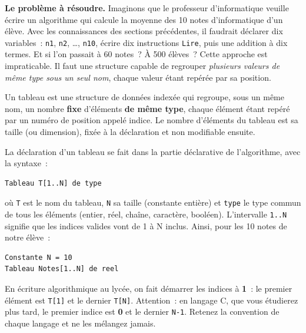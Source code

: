 \documentclass[11pt]{article}
\newcommand{\cle}[1]{{\popxbold\color{popdark}#1}}
\begin{document}
\textbf{Le probl\`eme \`a r\'esoudre.} Imaginons que le professeur d'informatique veuille \'ecrire un algorithme qui calcule la moyenne des 10 notes d'informatique d'un \'el\`eve. Avec les connaissances des sections pr\'ec\'edentes, il faudrait d\'eclarer dix variables~: \texttt{n1}, \texttt{n2}, \ldots, \texttt{n10}, \'ecrire dix instructions \texttt{Lire}, puis une addition \`a dix termes. Et si l'on passait \`a 60 notes~? \`A 500 \'el\`eves~? Cette approche est impraticable. Il faut une structure capable de regrouper \emph{plusieurs valeurs de m\^eme type sous un seul nom}, chaque valeur \'etant rep\'er\'ee par sa position.

\begin{definition}[Tableau]
Un \cle{tableau} est une structure de donn\'ees index\'ee qui regroupe, sous un m\^eme nom, un nombre \textbf{fixe} d'\'el\'ements \textbf{de m\^eme type}, chaque \'el\'ement \'etant rep\'er\'e par un num\'ero de position appel\'e \cle{indice}. Le nombre d'\'el\'ements du tableau est sa \cle{taille} (ou dimension), fix\'ee \`a la d\'eclaration et non modifiable ensuite.
\end{definition}

\begin{propriete}
La d\'eclaration d'un tableau se fait dans la partie d\'eclarative de l'algorithme, avec la syntaxe~:
\begin{lstlisting}
Tableau T[1..N] de type
\end{lstlisting}
o\`u \texttt{T} est le nom du tableau, \texttt{N} sa taille (constante enti\`ere) et \texttt{type} le type commun de tous les \'el\'ements (entier, r\'eel, cha\^ine, caract\`ere, bool\'een). L'intervalle \texttt{1..N} signifie que les indices valides vont de 1 \`a N inclus. Ainsi, pour les 10 notes de notre \'el\`eve~:
\begin{lstlisting}
Constante N = 10
Tableau Notes[1..N] de reel
\end{lstlisting}
\end{propriete}

\begin{attention}
En \'ecriture algorithmique au lyc\'ee, on fait d\'emarrer les indices \`a \textbf{1}~: le premier \'el\'ement est \texttt{T[1]} et le dernier \texttt{T[N]}. Attention~: en langage C, que vous \'etudierez plus tard, le premier indice est \textbf{0} et le dernier \texttt{N-1}. Retenez la convention de chaque langage et ne les m\'elangez jamais.
\end{attention}
\end{document}
